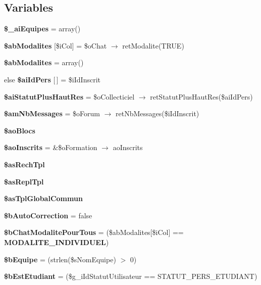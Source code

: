\subsection*{Variables}
\begin{CompactItemize}
\item 
\textbf{\$\_\-aiEquipes} = array()\label{tableau__bord_8php_5ed8e9be3df27e959cc9cf402b557de6}

\item 
\textbf{\$abModalites} [\$iCol] = \$oChat $\rightarrow$ retModalite(TRUE)\label{tableau__bord_8php_dc03c967648afca553106c9f0705d9bb}

\item 
\textbf{\$abModalites} = array()\label{tableau__bord_8php_748f5c2f20e3a889d857f79e9f11c48e}

\item 
else \textbf{\$aiIdPers} [$\,$] = \$iIdInscrit\label{tableau__bord_8php_011b12ccc39756c455a1ee74609df5d4}

\item 
\textbf{\$aiStatutPlusHautRes} = \$oCollecticiel $\rightarrow$ retStatutPlusHautRes(\$aiIdPers)\label{tableau__bord_8php_c8e552938c78391792e2c9c47358bcf5}

\item 
\textbf{\$amNbMessages} = \$oForum $\rightarrow$ retNbMessages(\$iIdInscrit)\label{tableau__bord_8php_dda8e5359e1b65c2b5ead97deac48641}

\item 
\textbf{\$aoBlocs}
\item 
\textbf{\$aoInscrits} = \&\$oFormation $\rightarrow$ aoInscrits\label{tableau__bord_8php_438e55a165e3380d09d91c3505dfdcc3}

\item 
\textbf{\$asRechTpl}
\item 
\textbf{\$asReplTpl}
\item 
\textbf{\$asTplGlobalCommun}
\item 
\textbf{\$bAutoCorrection} = false\label{tableau__bord_8php_64aee1c5a9db38afe79eba56dee9a91f}

\item 
\textbf{\$bChatModalitePourTous} = (\$abModalites[\$iCol] == {\bf MODALITE\_\-INDIVIDUEL})\label{tableau__bord_8php_61995fbbf3e161259c4c507f1d33864a}

\item 
\textbf{\$bEquipe} = (strlen(\$sNomEquipe) $>$ 0)\label{tableau__bord_8php_fb3cbe8f61757476361977c7194c8083}

\item 
\textbf{\$bEstEtudiant} = (\$g\_\-iIdStatutUtilisateur == STATUT\_\-PERS\_\-ETUDIANT)\label{tableau__bord_8php_d7da8af0cfb477679c7c4ee39d645252}


\end{CompactItemize}
